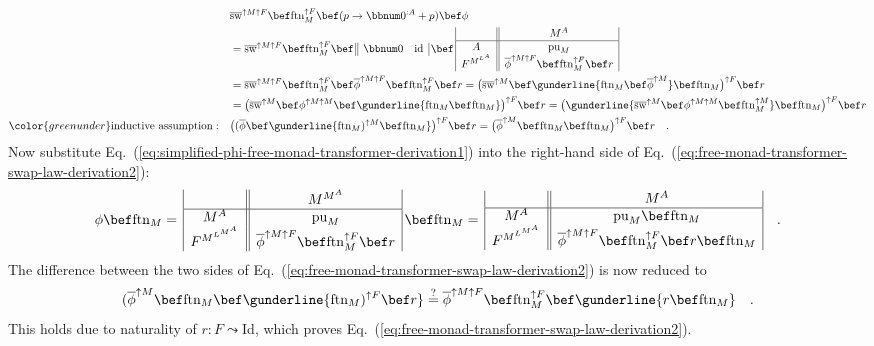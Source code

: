 \begin{align*}
 & \overline{\text{sw}}^{\uparrow M\uparrow F}\bef\text{ftn}_{M}^{\uparrow F}\bef(p\rightarrow\bbnum 0^{:A}+p)\bef\phi\\
 & =\overline{\text{sw}}^{\uparrow M\uparrow F}\bef\text{ftn}_{M}^{\uparrow F}\bef\,\begin{array}{||cc|}
\bbnum 0 & \text{id}\end{array}\,\bef\,\begin{array}{|c||c|}
 & M^{A}\\
\hline A & \text{pu}_{M}\\
F^{M^{L^{A}}} & \overline{\phi}^{\uparrow M\uparrow F}\bef\text{ftn}_{M}^{\uparrow F}\bef r
\end{array}\\
 & =\overline{\text{sw}}^{\uparrow M\uparrow F}\bef\text{ftn}_{M}^{\uparrow F}\bef\overline{\phi}^{\uparrow M\uparrow F}\bef\text{ftn}_{M}^{\uparrow F}\bef r=\big(\overline{\text{sw}}^{\uparrow M}\bef\gunderline{\text{ftn}_{M}\bef\overline{\phi}^{\uparrow M}}\bef\text{ftn}_{M}\big)^{\uparrow F}\bef r\\
 & =\big(\overline{\text{sw}}^{\uparrow M}\bef\phi^{\uparrow M\uparrow M}\bef\gunderline{\text{ftn}_{M}\bef\text{ftn}_{M}}\big)^{\uparrow F}\bef r=\big(\gunderline{\overline{\text{sw}}^{\uparrow M}\bef\phi^{\uparrow M\uparrow M}\bef\text{ftn}_{M}^{\uparrow M}}\bef\text{ftn}_{M}\big)^{\uparrow F}\bef r\\
{\color{greenunder}\text{inductive assumption}:}\quad & \big((\overline{\phi}\bef\gunderline{\text{ftn}_{M})^{\uparrow M}\bef\text{ftn}_{M}}\big)^{\uparrow F}\bef r=\big(\overline{\phi}^{\uparrow M}\bef\text{ftn}_{M}\bef\text{ftn}_{M}\big)^{\uparrow F}\bef r\quad.
\end{align*}
Now substitute Eq.~(\ref{eq:simplified-phi-free-monad-transformer-derivation1})
into the right-hand side of Eq.~(\ref{eq:free-monad-transformer-swap-law-derivation2}):
\[
\phi\bef\text{ftn}_{M}=\,\begin{array}{|c||c|}
 & M^{M^{A}}\\
\hline M^{A} & \text{pu}_{M}\\
F^{M^{L^{M^{A}}}} & \overline{\phi}^{\uparrow M\uparrow F}\bef\text{ftn}_{M}^{\uparrow F}\bef r
\end{array}\,\bef\text{ftn}_{M}=\,\begin{array}{|c||c|}
 & M^{A}\\
\hline M^{A} & \text{pu}_{M}\bef\text{ftn}_{M}\\
F^{M^{L^{M^{A}}}} & \overline{\phi}^{\uparrow M\uparrow F}\bef\text{ftn}_{M}^{\uparrow F}\bef r\bef\text{ftn}_{M}
\end{array}\quad.
\]
The difference between the two sides of Eq.~(\ref{eq:free-monad-transformer-swap-law-derivation2})
is now reduced to
\[
(\overline{\phi}^{\uparrow M}\bef\text{ftn}_{M}\bef\gunderline{\text{ftn}_{M})^{\uparrow F}\bef r}\overset{?}{=}\overline{\phi}^{\uparrow M\uparrow F}\bef\text{ftn}_{M}^{\uparrow F}\bef\gunderline{r\bef\text{ftn}_{M}}\quad.
\]
This holds due to naturality of $r:F\leadsto\text{Id}$, which proves
Eq.~(\ref{eq:free-monad-transformer-swap-law-derivation2}).

